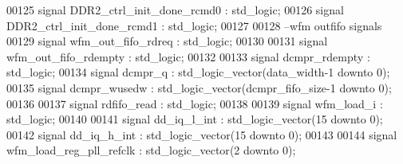 \begin{DoxyCode}
00125 \textcolor{keywordflow}{signal} \textcolor{vhdlchar}{DDR2_ctrl_init_done_rcmd0}    \textcolor{vhdlchar}{:} \textcolor{comment}{std\_logic};
00126 \textcolor{keywordflow}{signal} \textcolor{vhdlchar}{DDR2_ctrl_init_done_rcmd1}    \textcolor{vhdlchar}{:} \textcolor{comment}{std\_logic};
00127 
00128 \textcolor{keyword}{--wfm outfifo signals}
00129 \textcolor{keywordflow}{signal} \textcolor{vhdlchar}{wfm_out_fifo_rdreq}               \textcolor{vhdlchar}{:} \textcolor{comment}{std\_logic};
00130 
00131 \textcolor{keywordflow}{signal} \textcolor{vhdlchar}{wfm_out_fifo_rdempty}         \textcolor{vhdlchar}{:} \textcolor{comment}{std\_logic}; 
00132 
00133 \textcolor{keywordflow}{signal} \textcolor{vhdlchar}{dcmpr_rdempty}                        \textcolor{vhdlchar}{:} \textcolor{comment}{std\_logic};
00134 \textcolor{keywordflow}{signal} \textcolor{vhdlchar}{dcmpr_q}                              \textcolor{vhdlchar}{:} \textcolor{comment}{std\_logic\_vector}\textcolor{vhdlchar}{(}\textcolor{vhdlchar}{data_width}\textcolor{vhdlchar}{-}\textcolor{vhdllogic}{}\textcolor{vhdllogic}{1} \textcolor{keywordflow}{downto} \textcolor{vhdllogic}{}\textcolor{vhdllogic}{0}\textcolor{vhdlchar}{)};
00135 \textcolor{keywordflow}{signal} \textcolor{vhdlchar}{dcmpr_wusedw}                     \textcolor{vhdlchar}{:} \textcolor{comment}{std\_logic\_vector}\textcolor{vhdlchar}{(}\textcolor{vhdlchar}{dcmpr_fifo_size}\textcolor{vhdlchar}{-}\textcolor{vhdllogic}{}\textcolor{vhdllogic}{1} \textcolor{keywordflow}{downto} \textcolor{vhdllogic}{}\textcolor{vhdllogic}{0}\textcolor{vhdlchar}{)}; 
00136 
00137 \textcolor{keywordflow}{signal} \textcolor{vhdlchar}{rdfifo_read}                      \textcolor{vhdlchar}{:} \textcolor{comment}{std\_logic};
00138 
00139 \textcolor{keywordflow}{signal} \textcolor{vhdlchar}{wfm_load_i}                           \textcolor{vhdlchar}{:} \textcolor{comment}{std\_logic};
00140 
00141 \textcolor{keywordflow}{signal} \textcolor{vhdlchar}{dd_iq_l_int}                      \textcolor{vhdlchar}{:} \textcolor{comment}{std\_logic\_vector}\textcolor{vhdlchar}{(}\textcolor{vhdllogic}{}\textcolor{vhdllogic}{15} \textcolor{keywordflow}{downto} \textcolor{vhdllogic}{}\textcolor{vhdllogic}{0}\textcolor{vhdlchar}{)};
00142 \textcolor{keywordflow}{signal} \textcolor{vhdlchar}{dd_iq_h_int}                      \textcolor{vhdlchar}{:} \textcolor{comment}{std\_logic\_vector}\textcolor{vhdlchar}{(}\textcolor{vhdllogic}{}\textcolor{vhdllogic}{15} \textcolor{keywordflow}{downto} \textcolor{vhdllogic}{}\textcolor{vhdllogic}{0}\textcolor{vhdlchar}{)};
00143 
00144 \textcolor{keywordflow}{signal} \textcolor{vhdlchar}{wfm_load_reg_pll_refclk}      \textcolor{vhdlchar}{:} \textcolor{comment}{std\_logic\_vector}\textcolor{vhdlchar}{(}\textcolor{vhdllogic}{}\textcolor{vhdllogic}{2} \textcolor{keywordflow}{downto} \textcolor{vhdllogic}{}\textcolor{vhdllogic}{0}\textcolor{vhdlchar}{)};

\end{DoxyCode}

